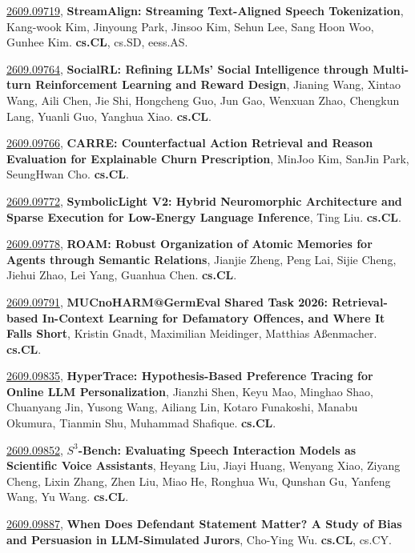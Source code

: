 \documentclass[9pt, a4paper]{article}
\theoremstyle{plain}
\theoremstyle{definition}
\theoremstyle{remark}
\newcommand{\arxivwithtarget}[3]{\hypertarget{#1}{}\href{https://arxiv.org/abs/#1}{#1}, \textbf{\textcolor{arxivblue}{#2}}, #3. }
\begin{document}
\arxivwithtarget{2609.09719}{StreamAlign: Streaming Text-Aligned Speech Tokenization}{Kang-wook Kim, Jinyoung Park, Jinsoo Kim, Sehun Lee, Sang Hoon Woo, Gunhee Kim}\textbf{cs.CL}, cs.SD, eess.AS.



\arxivwithtarget{2609.09764}{SocialRL: Refining LLMs' Social Intelligence through Multi-turn Reinforcement Learning and Reward Design}{Jianing Wang, Xintao Wang, Aili Chen, Jie Shi, Hongcheng Guo, Jun Gao, Wenxuan Zhao, Chengkun Lang, Yuanli Guo, Yanghua Xiao}\textbf{cs.CL}.



\arxivwithtarget{2609.09766}{CARRE: Counterfactual Action Retrieval and Reason Evaluation for Explainable Churn Prescription}{MinJoo Kim, SanJin Park, SeungHwan Cho}\textbf{cs.CL}.



\arxivwithtarget{2609.09772}{SymbolicLight V2: Hybrid Neuromorphic Architecture and Sparse Execution for Low-Energy Language Inference}{Ting Liu}\textbf{cs.CL}.



\arxivwithtarget{2609.09778}{ROAM: Robust Organization of Atomic Memories for Agents through Semantic Relations}{Jianjie Zheng, Peng Lai, Sijie Cheng, Jiehui Zhao, Lei Yang, Guanhua Chen}\textbf{cs.CL}.



\arxivwithtarget{2609.09791}{MUCnoHARM@GermEval Shared Task 2026: Retrieval-based In-Context Learning for Defamatory Offences, and Where It Falls Short}{Kristin Gnadt, Maximilian Meidinger, Matthias Aßenmacher}\textbf{cs.CL}.



\arxivwithtarget{2609.09835}{HyperTrace: Hypothesis-Based Preference Tracing for Online LLM Personalization}{Jianzhi Shen, Keyu Mao, Minghao Shao, Chuanyang Jin, Yusong Wang, Ailiang Lin, Kotaro Funakoshi, Manabu Okumura, Tianmin Shu, Muhammad Shafique}\textbf{cs.CL}.



\arxivwithtarget{2609.09852}{$S^3$-Bench: Evaluating Speech Interaction Models as Scientific Voice Assistants}{Heyang Liu, Jiayi Huang, Wenyang Xiao, Ziyang Cheng, Lixin Zhang, Zhen Liu, Miao He, Ronghua Wu, Qunshan Gu, Yanfeng Wang, Yu Wang}\textbf{cs.CL}.



\arxivwithtarget{2609.09887}{When Does Defendant Statement Matter? A Study of Bias and Persuasion in LLM-Simulated Jurors}{Cho-Ying Wu}\textbf{cs.CL}, cs.CY.
\end{document}
